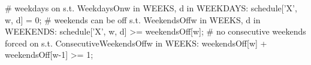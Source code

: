 \documentclass[a4paper]{article}
\begin{document}
# weekdays on
s.t. WeekdaysOn{w in WEEKS, d in WEEKDAYS}:
	schedule['X', w, d] = 0;
# weekends can be off
s.t. WeekendsOff{w in WEEKS, d in WEEKENDS}:
	schedule['X', w, d] >= weekendsOff[w];
# no consecutive weekends forced on
s.t. ConsecutiveWeekendsOff{w in WEEKS}:
	weekendsOff[w] + weekendsOff[w-1] >= 1;
\fi
\end{document}
